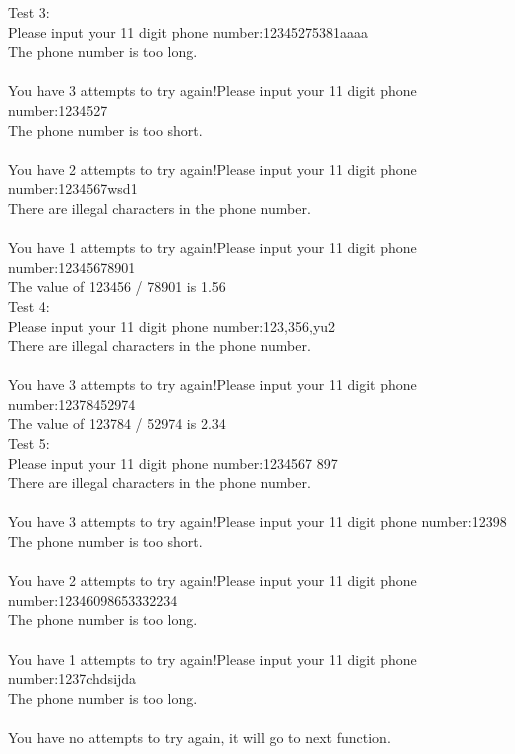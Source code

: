 \documentclass[12pt]{article}
\begin{document}
	\noindent Test 3:\\
	Please input your 11 digit phone number:12345275381aaaa\\
	The phone number is too long.\\\\	
	You have 3 attempts to try again!Please input your 11 digit phone number:1234527\\
	The phone number is too short.\\\\	
	You have 2 attempts to try again!Please input your 11 digit phone number:1234567wsd1\\
	There are illegal characters in the phone number.\\\\	
	You have 1 attempts to try again!Please input your 11 digit phone number:12345678901\\
	The value of 123456 / 78901 is 1.56\\
	
	\noindent Test 4:\\
	Please input your 11 digit phone number:123,356,yu2\\
	There are illegal characters in the phone number.\\\\	
	You have 3 attempts to try again!Please input your 11 digit phone number:12378452974\\
	The value of 123784 / 52974 is 2.34\\
	
	\noindent Test 5:\\
	Please input your 11 digit phone number:1234567 897\\
	There are illegal characters in the phone number.\\\\	
	You have 3 attempts to try again!Please input your 11 digit phone number:12398\\
	The phone number is too short.\\\\	
	You have 2 attempts to try again!Please input your 11 digit phone number:12346098653332234\\
	The phone number is too long.\\\\	
	You have 1 attempts to try again!Please input your 11 digit phone number:1237chdsijda\\
	The phone number is too long.\\\\	
	You have no attempts to try again, it will go to next function.
	
\end{document}
